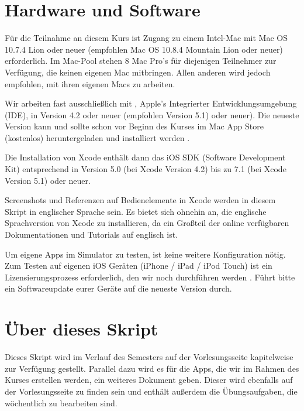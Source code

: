 \documentclass[parskip=half, final]{scrreprt}
\newcommand{\vxcode}{5.1}
\newcommand{\vios}{7.1}
\begin{document}
\section{Hardware und Software} \label{sec:hwsw}

Für die Teilnahme an diesem Kurs ist Zugang zu einem Intel-Mac mit Mac OS 10.7.4 Lion oder neuer (empfohlen Mac OS 10.8.4 Mountain Lion oder neuer) erforderlich. Im Mac-Pool stehen 8 Mac Pro's für diejenigen Teilnehmer zur Verfügung, die keinen eigenen Mac mitbringen. Allen anderen wird jedoch empfohlen, mit ihren eigenen Macs zu arbeiten.

Wir arbeiten fast ausschließlich mit , Apple's Integrierter Entwicklungsumgebung (IDE), in Version 4.2 oder neuer (empfohlen Version \vxcode{}) oder neuer). Die neueste Version kann und sollte schon vor Beginn des Kurses im Mac App Store (kostenlos) heruntergeladen und installiert werden .

Die Installation von Xcode enthält dann das iOS SDK (Software Development Kit) entsprechend in Version 5.0 (bei Xcode Version 4.2) bis zu \vios{} (bei Xcode Version \vxcode{}) oder neuer.

Screenshots und Referenzen auf Bedienelemente in Xcode werden in diesem Skript in englischer Sprache sein. Es bietet sich ohnehin an, die englische Sprachversion von Xcode zu installieren, da ein Großteil der online verfügbaren Dokumentationen und Tutorials auf englisch ist.

Um eigene Apps im Simulator zu testen, ist keine weitere Konfiguration nötig. Zum Testen auf eigenen iOS Geräten (iPhone / iPad / iPod Touch) ist ein Lizensierungsprozess erforderlich, den wir noch durchführen werden . Führt bitte ein Softwareupdate eurer Geräte auf die neueste Version durch.

\section{Über dieses Skript}

Dieses Skript wird im Verlauf des Semesters auf der Vorlesungsseite  kapitelweise zur Verfügung gestellt. Parallel dazu wird es für die Apps, die wir im Rahmen des Kurses erstellen werden, ein weiteres Dokument geben. Dieser  wird ebenfalls auf der Vorlesungsseite zu finden sein und enthält außerdem die Übungsaufgaben, die wöchentlich zu bearbeiten sind.
\end{document}
